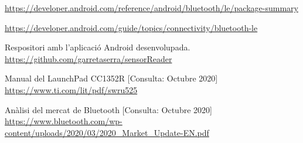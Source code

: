 \begin{thebibliography}{2}
\href{https://developer.android.com/reference/android/bluetooth/le/package-summary}{https://developer.android.com/reference/android/bluetooth/le/package-summary}


\href{https://developer.android.com/guide/topics/connectivity/bluetooth-le}{https://developer.android.com/guide/topics/connectivity/bluetooth-le}

Respositori amb l'aplicació Android desenvolupada. \newline
\href{https://github.com/garretaserra/sensorReader}{https://github.com/garretaserra/sensorReader}

Manual del LaunchPad CC1352R
[Consulta: Octubre 2020] \newline
\href{https://www.ti.com/lit/pdf/swru525}{https://www.ti.com/lit/pdf/swru525}

Anàlisi del mercat de Bluetooth
[Consulta: Octubre 2020] \newline
\href{https://www.bluetooth.com/wp-content/uploads/2020/03/2020\_Market\_Update-EN.pdf}{https://www.bluetooth.com/wp-content/uploads/2020/03/2020\_Market\_Update-EN.pdf}

\end{thebibliography}